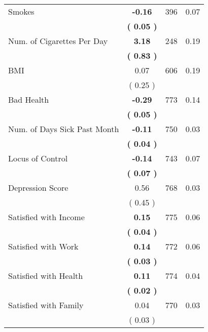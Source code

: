 \begin{tabular}{lccc}
Smokes & \textbf{    -0.16} & 396 &      0.07 \\ 
 & \textbf{(     0.05 )} & \\
Num. of Cigarettes Per Day & \textbf{     3.18} & 248 &      0.19 \\ 
 & \textbf{(     0.83 )} & \\
BMI &      0.07 & 606 &      0.19 \\ 
 & (     0.25 ) & \\
Bad Health & \textbf{    -0.29} & 773 &      0.14 \\ 
 & \textbf{(     0.05 )} & \\
Num. of Days Sick Past Month & \textbf{    -0.11} & 750 &      0.03 \\ 
 & \textbf{(     0.04 )} & \\
Locus of Control & \textbf{    -0.14} & 743 &      0.07 \\ 
 & \textbf{(     0.07 )} & \\
Depression Score &      0.56 & 768 &      0.03 \\ 
 & (     0.45 ) & \\
Satisfied with Income & \textbf{     0.15} & 775 &      0.06 \\ 
 & \textbf{(     0.04 )} & \\
Satisfied with Work & \textbf{     0.14} & 772 &      0.06 \\ 
 & \textbf{(     0.03 )} & \\
Satisfied with Health & \textbf{     0.11} & 774 &      0.04 \\ 
 & \textbf{(     0.02 )} & \\
Satisfied with Family &      0.04 & 770 &      0.03 \\ 
 & (     0.03 ) & \\
\bottomrule
\end{tabular}
